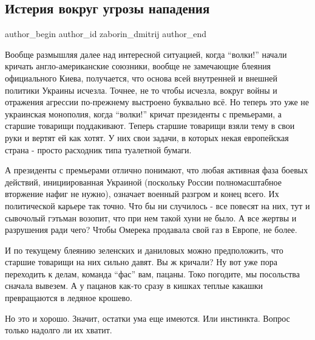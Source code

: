  
 
 
 
 
 
\subsection{Истерия вокруг угрозы нападения}
\label{sec:26_01_2022.fb.zaborin_dmitrij.1.isteria}
 
\ifcmt
 author_begin
   author_id zaborin_dmitrij
 author_end
\fi

Вообще размышляя далее над интересной ситуацией, когда \enquote{волки!} начали кричать
англо-американские союзники, вообще не замечающие блеяния официального Киева,
получается, что основа всей внутренней и внешней политики Украины исчезла.
Точнее, не то чтобы исчезла, вокруг войны и отражения агрессии по-прежнему
выстроено буквально всё. Но теперь это уже не украинская монополия, когда
\enquote{волки!} кричат президенты с премьерами, а старшие товарищи поддакивают. Теперь
старшие товарищи взяли тему в свои руки и вертят ей как хотят. У них свои
задачи, в которых некая европейская страна - просто расходник типа туалетной
бумаги.

А президенты с премьерами отлично понимают, что любая активная фаза боевых
действий, инициированная Украиной (поскольку России полномасштабное вторжение
нафиг не нужно), означает военный разгром и конец всего. Их политической
карьере так точно. Что бы ни случилось - все повесят на них, тут и сывочолый
гэтьман возопит, что при нем такой хуни не было. А все жертвы и разрушения ради
чего? Чтобы Омерека продавала свой газ в Европе, не более. 

И по текущему блеянию зеленских и даниловых можно предположить, что старшие
товарищи на них сильно давят. Вы ж кричали? Ну вот уже пора переходить к делам,
команда \enquote{фас} вам, пацаны. Токо погодите, мы посольства сначала вывезем. А у
пацанов как-то сразу в кишках теплые какашки превращаются в ледяное крошево. 

Но это и хорошо. Значит, остатки ума еще имеются. Или инстинкта. Вопрос только
надолго ли их хватит.

